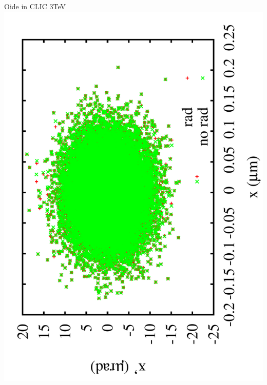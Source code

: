 \documentclass{beamer}
\begin{document}
\begin{frame}{Oide in CLIC 3TeV}
 \includegraphics[scale=0.2,angle=-90]{plotxrad.pdf}

\end{frame}
\end{document}
